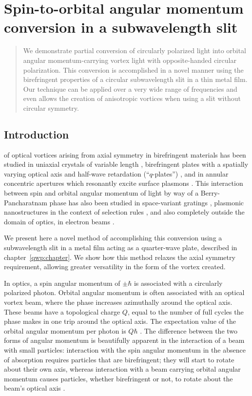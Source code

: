 \chapter{Spin-to-orbital angular momentum conversion in a subwavelength slit}
\label{soc:chapter}

\begin{abstract}
We demonstrate partial conversion of circularly polarized light into orbital angular momentum-carrying vortex light with opposite-handed circular polarization. This conversion is accomplished in a novel manner using the birefringent properties of a circular subwavelength slit in a thin metal film. Our technique can be applied over a very wide range of frequencies and even allows the creation of anisotropic vortices when using a slit without circular symmetry.
\end{abstract}

\section{Introduction}

 of optical vortices arising from axial symmetry in birefringent materials has been studied in uniaxial crystals of variable length \cite{Ciattoni2003, Brasselet2009b}, birefringent plates with a spatially varying optical axis and half-wave retardation (``$q$-plates'') \cite{Marrucci2006, Karimi2009, Brasselet2011}, and in annular concentric apertures which resonantly excite surface plasmons \cite{Lombard2010}. This interaction between spin and orbital angular momentum of light by way of a Berry-Pan\-cha\-rat\-nam phase has also been studied in space-variant gratings \cite{Bomzon2001}, plasmonic nanostructures in the context of selection rules \cite{Gorodetski2009}, and also completely outside the domain of optics, in electron beams \cite{Karimi2012}.

We present here a novel method of accomplishing this conversion using a subwavelength slit in a metal film acting as a quarter-wave plate, described in chapter~\ref{qwp:chapter}. We show how this method relaxes the axial symmetry requirement, allowing greater versatility in the form of the vortex created.

In optics, a spin angular momentum of $\pm \hbar $ is associated with a circularly polarized photon. Orbital angular momentum is often associated with an optical vortex beam, where the phase increases azimuthally around the optical axis. These beams have a topological charge $Q$, equal to the number of full cycles the phase makes in one trip around the optical axis. The expectation value of the orbital angular momentum per photon is $Q\hbar $ \cite{Allen1992}. The difference between the two forms of angular momentum is beautifully apparent in the interaction of a beam with small particles: interaction with the spin angular momentum in the absence of absorption requires particles that are birefringent; they will start to rotate about their  own axis, whereas interaction with a beam carrying orbital angular momentum causes particles, whether birefringent or not, to rotate about the beam's optical axis \cite{ONeil2002}.

